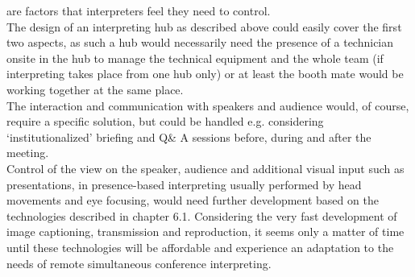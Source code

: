 \documentclass[output=paper]{langsci/langscibook}
\begin{document}
are factors that interpreters feel they need to control.\\
The design of an interpreting hub as described above could easily cover the first two aspects, as such a hub would necessarily need the presence of a technician onsite in the hub to manage the technical equipment and the whole team (if interpreting takes place from one hub only) or at least the booth mate would be working together at the same place. \\
The interaction and communication with speakers and audience would, of course, require a specific solution, but could be handled e.g. considering ‘institutionalized’ briefing and Q\& A sessions before, during and after the meeting.\\
Control of the view on the speaker, audience and additional visual input such as presentations, in presence-based interpreting usually performed by head movements and eye focusing, would need further development based on the technologies described in chapter 6.1. Considering the very fast development of image captioning, transmission and reproduction, it seems only a matter of time until these technologies will be affordable and experience an adaptation to the needs of remote simultaneous conference interpreting. 
\end{document}
